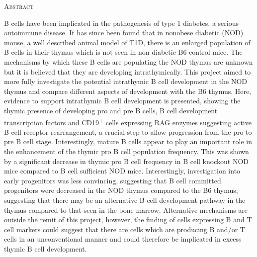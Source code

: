 
\newevenside
\begin{center}
\fontsize{29}{29}\scshape Abstract\\[1cm]
\end{center}

B cells have been implicated in the pathogenesis of type 1 diabetes, a serious autoimmune disease. It has since been found that in nonobese diabetic (NOD) mouse, a well described animal model of T1D, there is an enlarged population of B cells in their thymus which is not seen in non diabetic B6 control mice. The mechanisms by which these B cells are populating the NOD thymus are unknown but it is believed that they are developing intrathymically.
This project aimed to more fully investigate the potential intrathymic B cell development in the NOD thymus and compare different aspects of development with the B6 thymus. Here, evidence to support intrathymic B cell development is presented, showing the thymic presence of developing pro and pre B cells, B cell development transcription factors and CD19\textsuperscript{+} cells expressing RAG enzymes suggesting active B cell receptor rearrangement, a crucial step to allow progression from the pro to pre B cell stage. Interestingly, mature B cells appear to play an important role in the enhancement of the thymic pro B cell population frequency. This was shown by a significant decrease in thymic pro B cell frequency in B cell knockout NOD mice compared to B cell sufficient NOD mice.
Interestingly, investigation into early progenitors was less convincing, suggesting that B cell committed progenitors were decreased in the NOD thymus compared to the B6 thymus, suggesting that there may be an alternative B cell development pathway in the thymus compared to that seen in the bone marrow. Alternative mechanisms are outside the remit of this project, however, the finding of cells expressing B and T cell markers could suggest that there are cells which are producing B and/or T cells in an unconventional manner and could therefore be implicated in excess thymic B cell development.

